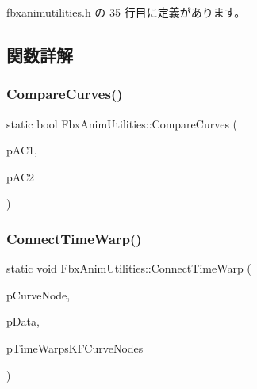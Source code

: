  fbxanimutilities.\+h の 35 行目に定義があります。



\subsection{関数詳解}
\mbox{\label{class_fbx_anim_utilities_a613e164f8bfb96506a7ffb8e4a5747ae}} 
\subsubsection{\texorpdfstring{Compare\+Curves()}{CompareCurves()}}
{\footnotesize\ttfamily static bool Fbx\+Anim\+Utilities\+::\+Compare\+Curves (\begin{DoxyParamCaption}\item[{\hyperlink{class_fbx_anim_curve}{Fbx\+Anim\+Curve} $\ast$}]{p\+A\+C1,  }\item[{\hyperlink{class_fbx_anim_curve}{Fbx\+Anim\+Curve} $\ast$}]{p\+A\+C2 }\end{DoxyParamCaption})\hspace{0.3cm}{\ttfamily [static]}}

\mbox{\label{class_fbx_anim_utilities_a3e8dfa1d4331e466d3add2c9cc4dd845}} 
\subsubsection{\texorpdfstring{Connect\+Time\+Warp()}{ConnectTimeWarp()}}
{\footnotesize\ttfamily static void Fbx\+Anim\+Utilities\+::\+Connect\+Time\+Warp (\begin{DoxyParamCaption}\item[{\hyperlink{class_fbx_anim_curve_node}{Fbx\+Anim\+Curve\+Node} $\ast$}]{p\+Curve\+Node,  }\item[{\hyperlink{class_fbx_anim_utilities_1_1_curve_node_intfce}{Curve\+Node\+Intfce} \&}]{p\+Data,  }\item[{\hyperlink{class_fbx_multi_map}{Fbx\+Multi\+Map} \&}]{p\+Time\+Warps\+K\+F\+Curve\+Nodes }\end{DoxyParamCaption})\hspace{0.3cm}{\ttfamily [static]}}


